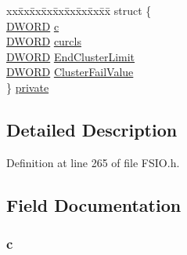 \begin{DoxyCompactItemize}
\begin{tabbing}
\end{tabbing}\item 
\begin{tabbing}
xx\=xx\=xx\=xx\=xx\=xx\=xx\=xx\=xx\=\kill
struct \{\\
\>\hyperlink{_generic_type_defs_8h_ad342ac907eb044443153a22f964bf0af}{DWORD} \hyperlink{struct_f_s___d_i_s_k___p_r_o_p_e_r_t_i_e_s_aab7575f1bf52a286a0c34442f4850526}{c}\\
\>\hyperlink{_generic_type_defs_8h_ad342ac907eb044443153a22f964bf0af}{DWORD} \hyperlink{struct_f_s___d_i_s_k___p_r_o_p_e_r_t_i_e_s_a1e589971cb72be926eb29053d25f8391}{curcls}\\
\>\hyperlink{_generic_type_defs_8h_ad342ac907eb044443153a22f964bf0af}{DWORD} \hyperlink{struct_f_s___d_i_s_k___p_r_o_p_e_r_t_i_e_s_a402d6cb1948480563b26f6c986eb2a03}{EndClusterLimit}\\
\>\hyperlink{_generic_type_defs_8h_ad342ac907eb044443153a22f964bf0af}{DWORD} \hyperlink{struct_f_s___d_i_s_k___p_r_o_p_e_r_t_i_e_s_ae01f153d011ef77816b9a3cee5690179}{ClusterFailValue}\\
\} \hyperlink{struct_f_s___d_i_s_k___p_r_o_p_e_r_t_i_e_s_ae4abac1bde86876c6836929252ac1e94}{private}\\

\end{tabbing}\end{DoxyCompactItemize}


\subsection{Detailed Description}


Definition at line 265 of file F\+S\+I\+O.\+h.



\subsection{Field Documentation}
\hypertarget{struct_f_s___d_i_s_k___p_r_o_p_e_r_t_i_e_s_aab7575f1bf52a286a0c34442f4850526}{}
\subsubsection[{c}]{ c}\label{struct_f_s___d_i_s_k___p_r_o_p_e_r_t_i_e_s_aab7575f1bf52a286a0c34442f4850526}


